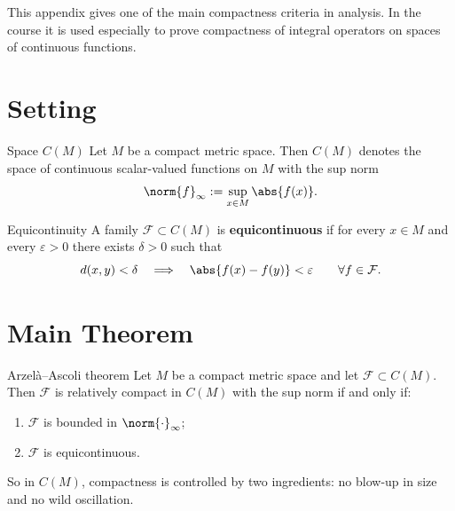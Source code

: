 \documentclass[header={Appendix A Exam Study Notes}]{study-note}
\begin{document}

\vspace{0.8em}

\begin{focusbox}
This appendix gives one of the main compactness criteria in analysis. In the course it is used especially to prove compactness of integral operators on spaces of continuous functions.
\end{focusbox}

\tableofcontents

\section{Setting}

\begin{defbox}{Space $C(M)$}
Let $M$ be a compact metric space. Then $C(M)$ denotes the space of continuous scalar-valued functions on $M$ with the sup norm
\[
\norm{f}_{\infty}:=\sup_{x\in M}\abs{f(x)}.
\]
\end{defbox}

\begin{defbox}{Equicontinuity}
A family $\mathcal F\subset C(M)$ is \textbf{equicontinuous} if for every $x\in M$ and every $\varepsilon>0$ there exists $\delta>0$ such that
\[
d(x,y)<\delta
\quad\Longrightarrow\quad
\abs{f(x)-f(y)}<\varepsilon
\qquad \forall f\in\mathcal F.
\]
\end{defbox}

\section{Main Theorem}

\begin{thmbox}{Arzel\`a--Ascoli theorem}
Let $M$ be a compact metric space and let $\mathcal F\subset C(M)$. Then $\mathcal F$ is relatively compact in $C(M)$ with the sup norm if and only if:
\begin{enumerate}
\item $\mathcal F$ is bounded in $\norm{\cdot}_{\infty}$;
\item $\mathcal F$ is equicontinuous.
\end{enumerate}
\end{thmbox}

\begin{focusbox}
So in $C(M)$, compactness is controlled by two ingredients: no blow-up in size and no wild oscillation.
\end{focusbox}
\end{document}
